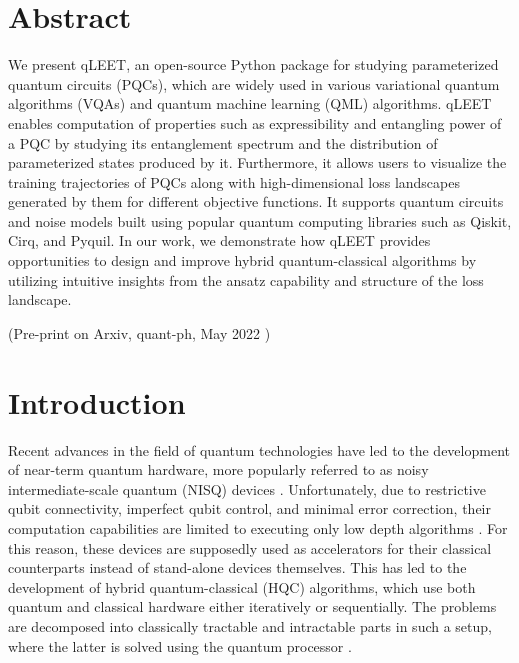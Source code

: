 \section{\label{qleet-sec:abstract}Abstract}

We present qLEET, an open-source Python package for studying parameterized quantum circuits (PQCs), which are widely used in various variational quantum algorithms (VQAs) and quantum machine learning (QML) algorithms. qLEET enables computation of properties such as expressibility and entangling power of a PQC by studying its entanglement spectrum and the distribution of parameterized states produced by it. Furthermore, it allows users to visualize the training trajectories of PQCs along with high-dimensional loss landscapes generated by them for different objective functions. It supports quantum circuits and noise models built using popular quantum computing libraries such as Qiskit, Cirq, and Pyquil. In our work, we demonstrate how qLEET provides opportunities to design and improve hybrid quantum-classical algorithms by utilizing intuitive insights from the ansatz capability and structure of the loss landscape.

{\smaller (Pre-print on Arxiv, quant-ph, May 2022 \cite{self-qleet})}    

\section{\label{qleet-sec:intro}Introduction}

Recent advances in the field of quantum technologies have led to the development of near-term quantum hardware, more popularly referred to as noisy intermediate-scale quantum (NISQ) devices \cite{nisq_preskill, RevModPhys.94.015004}. Unfortunately, due to restrictive qubit connectivity, imperfect qubit control, and minimal error correction, their computation capabilities are limited to executing only low depth algorithms \cite{9251243}. For this reason, these devices are supposedly used as accelerators for their classical counterparts instead of stand-alone devices themselves. This has led to the development of hybrid quantum-classical (HQC) algorithms, which use both quantum and classical hardware either iteratively or sequentially. The problems are decomposed into classically tractable and intractable parts in such a setup, where the latter is solved using the quantum processor \cite{Endo2021-zy}. 

